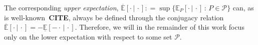 \documentclass[10pt,a4paper]{paper}
\theoremstyle{definition}
\newtheorem{exmp}{Example}%
\newcommand{\states}{\mathcal{X}}
\newcommand{\processes}{\mathbb{P}}
\newcommand{\rateset}{\mathcal{Q}}
\newcommand{\coloneqq}{:\!=}
\newcommand{\exampleend}{\hfill$\Diamond$}
\begin{document}
\noindent The corresponding \emph{upper expectation}, $\overline{\mathbb{E}}[\cdot\,\vert\,\cdot]\coloneqq \sup\{\mathbb{E}_P[\cdot\,\vert\,\cdot]\,:\,P\in\mathcal{P}\}$ can, as is well-known~{\bf CITE}, always be defined through the conjugacy relation $\overline{\mathbb{E}}[\cdot\,\vert\,\cdot]=-\underline{\mathbb{E}}[-\cdot\,\vert\,\cdot]$. Therefore, we will in the remainder of this work focus only on the lower expectation with respect to some set $\mathcal{P}$.







\end{document}
